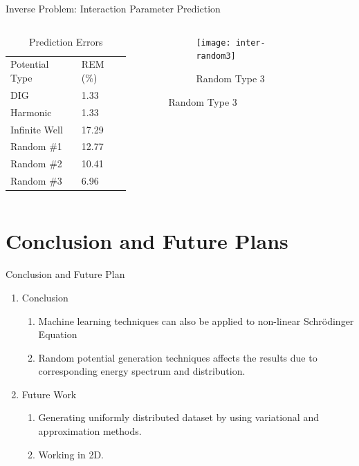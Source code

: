 \documentclass{beamer}
\begin{document}
\begin{frame}{Inverse Problem: Interaction Parameter Prediction}
    \begin{columns}
        \begin{column}{0.4\textwidth}
            \begin{table}[]
                \centering
                \caption{Prediction Errors}
                \begin{tabular}{ll}
                    Potential Type & REM (\%) \\
                    DIG            & 1.33     \\
                    Harmonic       & 1.33     \\
                    Infinite Well  & 17.29    \\
                    Random \#1     & 12.77    \\
                    Random \#2     & 10.41    \\
                    Random \#3     & 6.96                    
                \end{tabular}
            \end{table}
        \end{column}
        \begin{column}{0.8\textwidth}
        \graphicspath{{"../figs/training/interaction/"}}
        \begin{figure}[H]
            \begin{subfigure}[t]{0.80\textwidth}
                \texttt{[image: inter-random3]}
            \caption{Random Type 3}
            \end{subfigure}
        \end{figure}
        \end{column}
    \end{columns}
\end{frame}


\section{Conclusion and Future Plans}
\begin{frame}{Conclusion and Future Plan}

\begin{enumerate}
\item Conclusion
    \begin{enumerate}
    \item Machine learning techniques can also be applied to non-linear Schrödinger Equation 
    \item Random potential generation techniques affects the results due to corresponding energy spectrum and distribution.
    \end{enumerate}
\item Future Work
    \begin{enumerate}
    \item Generating uniformly distributed dataset by using variational and approximation methods.
    \item Working in 2D.
    \end{enumerate}
\end{enumerate}



\end{frame}
\end{document}
